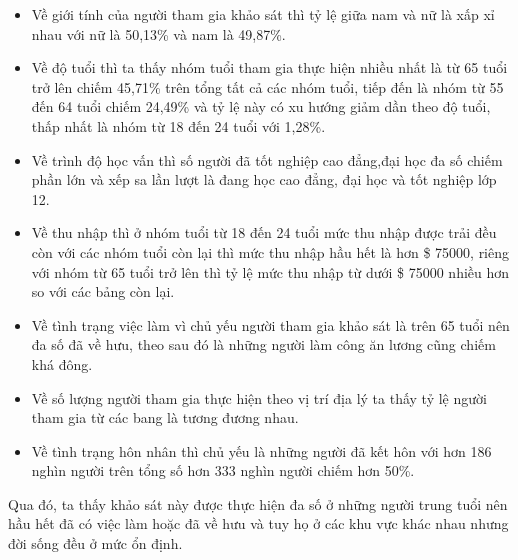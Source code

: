 \begin{enumerate}
\begin{itemize}[label = $-$]
        \item Về giới tính của người tham gia khảo sát thì tỷ lệ giữa nam và nữ là xấp xỉ nhau với nữ là 50,13\% và nam là 49,87\%.
        
        \item Về độ tuổi thì ta thấy nhóm tuổi tham gia thực hiện nhiều nhất là từ 65 tuổi trở lên chiếm 45,71\% trên tổng tất cả các nhóm tuổi, tiếp đến là nhóm từ 55 đến 64 tuổi chiếm 24,49\% và tỷ lệ này có xu hướng giảm dần theo độ tuổi, thấp nhất là nhóm từ 18 đến 24 tuổi với 1,28\%.
        
        \item Về trình độ học vấn thì số người đã tốt nghiệp cao đẳng,đại học đa số chiếm phần lớn và xếp sa lần lượt là đang học cao đẳng, đại học và tốt nghiệp lớp 12.
        
        \item Về thu nhập thì ở nhóm tuổi từ 18 đến 24 tuổi mức thu nhập được trải đều còn với các nhóm tuổi còn lại thì mức thu nhập hầu hết là hơn \$ 75000, riêng với nhóm từ 65 tuổi trở lên thì tỷ lệ mức thu nhập từ dưới \$ 75000 nhiều hơn so với các bảng còn lại.
        
        \item Về tình trạng việc làm vì chủ yếu người tham gia khảo sát là trên 65 tuổi nên đa số đã về hưu, theo sau đó là những người làm công ăn lương cũng chiếm khá đông.
        
        \item Về số lượng người tham gia thực hiện theo vị trí địa lý ta thấy tỷ lệ người tham gia từ các bang là tương đương nhau.
        
        \item Về tình trạng hôn nhân thì chủ yếu là những người đã kết hôn với hơn 186 nghìn người trên tổng số hơn 333 nghìn người chiếm hơn 50\%.
    \end{itemize}
Qua đó, ta thấy khảo sát này được thực hiện đa số ở những người trung tuổi nên hầu hết đã có việc làm hoặc đã về hưu và tuy họ ở các khu vực khác nhau nhưng đời sống đều ở mức ổn định.
    

\end{enumerate}
